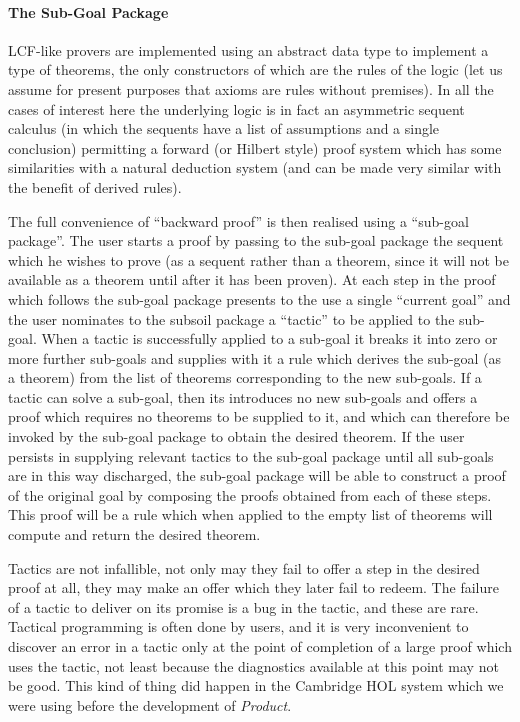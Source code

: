 \documentclass[10pt,titlepage]{book}
\begin{document}
\paragraph{The Sub-Goal Package}

LCF-like provers are implemented using an abstract data type to implement a type of theorems, the only constructors of which are the rules of the logic (let us assume for present purposes that axioms are rules without premises).
In all the cases of interest here the underlying logic is in fact an asymmetric sequent calculus (in which the sequents have a list of assumptions and a single conclusion) permitting a forward (or Hilbert style) proof system which has some similarities with a natural deduction system (and can be made very similar with the benefit of derived rules).

The full convenience of ``backward proof'' is then realised using a ``sub-goal package''.
The user starts a proof by passing to the sub-goal package the sequent which he wishes to prove (as a sequent rather than a theorem, since it will not be available as a theorem until after it has been proven).
At each step in the proof which follows the sub-goal package presents to the use a single ``current goal'' and the user nominates to the subsoil package a ``tactic'' to be applied to the sub-goal.
When a tactic is successfully applied to a sub-goal it breaks it into zero or more further sub-goals and supplies with it a rule which derives the sub-goal (as a theorem) from the list of theorems corresponding to the new sub-goals.
If a tactic can solve a sub-goal, then its introduces no new sub-goals and offers a proof which requires no theorems to be supplied to it, and which can therefore be invoked by the sub-goal package to obtain the desired theorem.
If the user persists in supplying relevant tactics to the sub-goal package until all sub-goals are in this way discharged, the sub-goal package will be able to construct a proof of the original goal by composing the proofs obtained from each of these steps.
This proof will be a rule which when applied to the empty list of theorems will compute and return the desired theorem.

Tactics are not infallible, not only may they fail to offer a step in the desired proof at all, they may make an offer which they later fail to redeem.
The failure of a tactic to deliver on its promise is a bug in the tactic, and these are rare.
Tactical programming is often done by users, and it is very inconvenient to discover an error in a tactic only at the point of completion of a large proof which uses the tactic, not least because the diagnostics available at this point may not be good.
This kind of thing did happen in the Cambridge HOL system which we were using before the development of {\it Product}.
\end{document}
